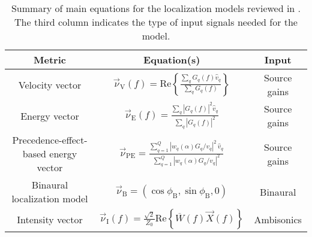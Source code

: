 \begin{table}[tbp]
\centering
\begin{tabular}{c|c|c}
\textbf{Metric} & \textbf{Equation(s)} & \textbf{Input} \\\hline\hline
\rule[-0.8cm]{0pt}{1.7cm} Velocity vector & $\vec{\nu}_{\text{V}}(f) = \textrm{Re} \left\{ \displaystyle \frac{ \sum_q G_q(f) \hat{v}_q}{ \sum_q G_q(f)} \right\}$ & Source gains \\\hline
\rule[-0.8cm]{0pt}{1.7cm} Energy vector & $\vec{\nu}_{\text{E}}(f) = \displaystyle \frac{ \sum_q |G_q(f)|^2 \hat{v}_q}{ \sum_q |G_q(f)|^2}$ & Source gains \\\hline
\rule[-1.5cm]{0pt}{3.1cm} \parbox{5cm}{\centering Precedence-effect-based energy vector} & $\vec{\nu}_{\text{PE}} = \displaystyle \frac{ \displaystyle \sum_{q=1}^Q |w_q(\alpha) G_q / v_q|^2 \, \hat{v}_q}{ \displaystyle \sum_{q=1}^Q |w_q(\alpha) G_q / v_q|^2}$ & Source gains \\\hline
\rule[-0.8cm]{0pt}{1.7cm} \parbox{5cm}{\centering Binaural localization model} & $\vec{\nu}_{\text{B}} = (\cos \phi_{\text{B}}, \sin \phi_{\text{B}}, 0)$ & Binaural \\\hline
\rule[-0.8cm]{0pt}{1.7cm} Intensity vector & $\vec{\nu}_{\textrm{I}}(f) = \displaystyle \frac{\sqrt{2}}{Z_0} \text{Re} \left\{ \overline{W}(f) \vec{X}(f) \right\}$ & Ambisonics
\end{tabular}
\caption[Summary of main equations for localization models.]{
Summary of main equations for the localization models reviewed in .
The third column indicates the type of input signals needed for the model.}
\label{tab:04_Auditory_Models:Localization_Equations}
\end{table}

